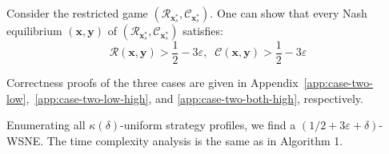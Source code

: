 Consider the restricted game \((\mathcal{R}_{\mathbf{x}_s^*}, \mathcal{C}_{\mathbf{x}_s^*})\). One can show that every Nash equilibrium \((\mathbf{x}, \mathbf{y})\) of \((\mathcal{R}_{\mathbf{x}_s^*}, \mathcal{C}_{\mathbf{x}_s^*})\) satisfies:
\[
  \mathcal{R}(\mathbf{x}, \mathbf{y}) > \frac12 - 3\varepsilon,\;\; \mathcal{C}(\mathbf{x}, \mathbf{y}) > \frac12 - 3\varepsilon
\]

Correctness proofs of the three cases are given in Appendix~\ref{app:case-two-low},~\ref{app:case-two-low-high}, and \ref{app:case-two-both-high}, respectively.

Enumerating all \(\kappa(\delta)\)-uniform strategy profiles, we find a \((1/2+3\varepsilon+\delta)\)-WSNE. The time complexity analysis is the same as in Algorithm 1.
